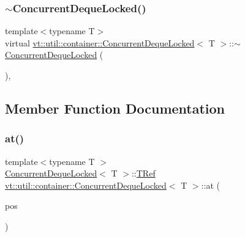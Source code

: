\mbox{\label{structvt_1_1util_1_1container_1_1_concurrent_deque_locked_a03ce93cd5ef587d5fa6dfd494ece5e73}} 
\subsubsection{\texorpdfstring{$\sim$\+Concurrent\+Deque\+Locked()}{~ConcurrentDequeLocked()}}
{\footnotesize\ttfamily template$<$typename T$>$ \\
virtual \hyperlink{structvt_1_1util_1_1container_1_1_concurrent_deque_locked}{vt\+::util\+::container\+::\+Concurrent\+Deque\+Locked}$<$ T $>$\+::$\sim$\hyperlink{structvt_1_1util_1_1container_1_1_concurrent_deque_locked}{Concurrent\+Deque\+Locked} (\begin{DoxyParamCaption}{ }\end{DoxyParamCaption})\hspace{0.3cm}{\ttfamily [inline]}, {\ttfamily [virtual]}}



\subsection{Member Function Documentation}
\mbox{\label{structvt_1_1util_1_1container_1_1_concurrent_deque_locked_a0999ea4ff06ed38095d31ed9710e7525}} 
\subsubsection{\texorpdfstring{at()}{at()}\hspace{0.1cm}{\footnotesize\ttfamily [1/2]}}
{\footnotesize\ttfamily template$<$typename T $>$ \\
\hyperlink{structvt_1_1util_1_1container_1_1_concurrent_deque_locked}{Concurrent\+Deque\+Locked}$<$ T $>$\+::\hyperlink{structvt_1_1util_1_1container_1_1_concurrent_deque_locked_a4451b0e7f6c8aa741f98a77a9fed353e}{T\+Ref} \hyperlink{structvt_1_1util_1_1container_1_1_concurrent_deque_locked}{vt\+::util\+::container\+::\+Concurrent\+Deque\+Locked}$<$ T $>$\+::at (\begin{DoxyParamCaption}\item[{\hyperlink{structvt_1_1util_1_1container_1_1_concurrent_deque_locked_a6f35f4923f1329d25378656b0582e916}{Size\+Type} const \&}]{pos }\end{DoxyParamCaption})}

